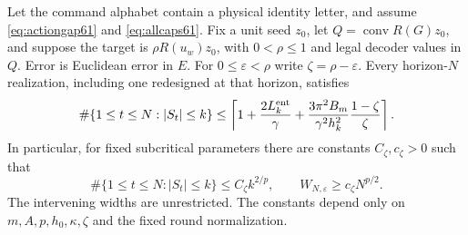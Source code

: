 \begin{theorem}\label{thm:sharpoccupation61}
Let the command alphabet contain a physical identity letter, and assume
\eqref{eq:actiongap61} and \eqref{eq:allcaps61}. Fix a unit seed $z_0$,
let $Q=\operatorname{conv}R(G)z_0$, and suppose the target is
$\rho R(u_w)z_0$, with $0<\rho\le1$ and legal decoder values in $Q$.
Error is Euclidean error in $E$. For $0\le\varepsilon<\rho$ write
$\zeta=\rho-\varepsilon$. Every horizon-$N$ realization, including
one redesigned at that horizon, satisfies
\begin{equation}\label{eq:sharpoccupation61}
 \#\{1\le t\le N:|S_t|\le k\}\le
 \left\lceil 1+\frac{2L_k^{\rm ent}}\gamma+
       \frac{3\pi^2B_m}{\gamma^2h_k^2}\frac{1-\zeta}{\zeta}\right\rceil.
\end{equation}
In particular, for fixed subcritical parameters there are constants
$C_\zeta,c_\zeta>0$ such that
\begin{equation}\label{eq:sharpwidth61}
 \#\{1\le t\le N:|S_t|\le k\}\le C_\zeta k^{2/p},
                 \qquad W_{N,\varepsilon}\ge c_\zeta N^{p/2}.
\end{equation}
The intervening widths are unrestricted. The constants depend only on
$m,A,p,h_0,\kappa,\zeta$ and the fixed round normalization.
\end{theorem}

